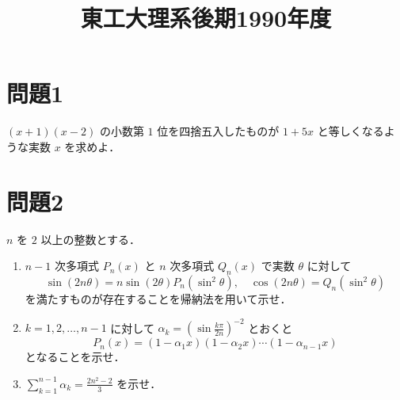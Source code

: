 \documentclass[unicode,12pt, a4paper]{ltjsarticle}%
\title{東工大理系後期1990年度}
\begin{document}
\maketitle
\section{問題1}
$(x+1)(x-2)$ の小数第 $1$ 位を四捨五入したものが $1+5x$ と等しくなるような実数 $x$ を求めよ．

\section{問題2}
\quad $n$ を $2$ 以上の整数とする．


\begin{enumerate}
  \item $n-1$ 次多項式 $P_n(x)$ と $n$ 次多項式 $Q_n(x)$ で実数 $\theta$ に対して
\[ \sin(2n\theta) = n \sin(2\theta) P_n(\sin^2\theta), \quad \cos(2n\theta) = Q_n(\sin^2\theta) \]
を満たすものが存在することを帰納法を用いて示せ．
  \item $k=1, 2, \dots, n-1$ に対して $\alpha_k = \left(\sin\frac{k\pi}{2n}\right)^{-2}$ とおくと
\[ P_n(x) = (1-\alpha_1 x)(1-\alpha_2 x)\cdots(1-\alpha_{n-1} x) \]
となることを示せ．
  \item $\sum_{k=1}^{n-1} \alpha_k = \frac{2n^2-2}{3}$ を示せ．
\end{enumerate}
\end{document}
